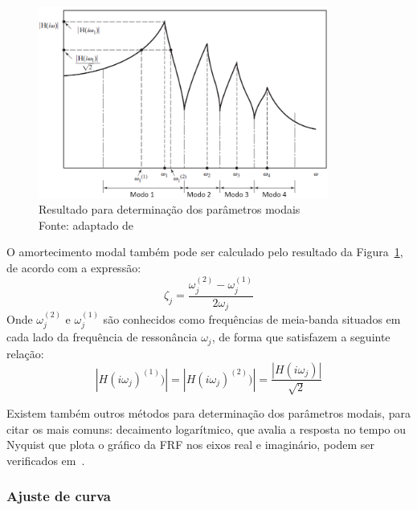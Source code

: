 \begin{figure}[h]
	\centering 
 	\includegraphics[width=0.85\textwidth]{figs/tipical_frf}
 	\caption[Resultado para determinação dos parâmetros modais]{Resultado para
 	determinação dos parâmetros modais \\ Fonte: adaptado de
 	\cite{rao2011mechanical}}
 	\label{fig::tipical_frf}
\end{figure}

O amortecimento modal também pode ser calculado pelo resultado da
Figura~\ref{fig::tipical_frf}, de acordo com a expressão:
%
\begin{equation}
	\zeta_j = \frac{\omega_j^{(2)} - \omega_j^{(1)}}{2 \omega_j}
\end{equation}
%
Onde $\omega_j^{(2)}$ e $\omega_j^{(1)}$ são conhecidos como frequências de
meia-banda situados em cada lado da frequência de ressonância $\omega_j$, de
forma que satisfazem a seguinte relação:
%
\begin{equation}
	\left | H(i\omega_j)^{(1)}) \right | = \left | H(i\omega_j)^{(2)}) \right | =
	\frac{\left | H(i\omega_j) \right |}{\sqrt{2}}
\end{equation}

Existem também outros métodos para determinação dos parâmetros modais, para
citar os mais comuns:
decaimento logarítmico, que avalia a resposta no tempo ou Nyquist que plota o
gráfico da FRF nos eixos real e imaginário, podem ser
verificados em~\cite{rao2011mechanical}.

\subsubsection{Ajuste de curva}

